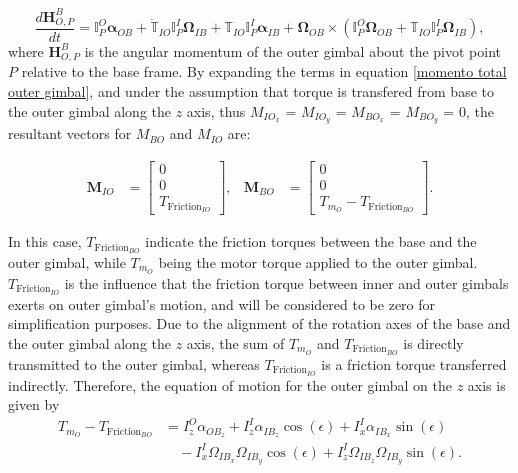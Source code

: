 \begin{equation}
   \label{momento total outer gimbal}
   \frac{d\bm{H}^B_{O,P}}{dt} = \mathbb{I}^O_P \bm{\alpha}_{OB} + \mathbb{\dot T}_{IO} \mathbb{I}^I_P \bm{\Omega}_{IB} + \mathbb{T}_{IO} \mathbb{I}^I_P \bm{\alpha}_{IB} + \bm{\Omega}_{OB} \times (\mathbb{I}^O_P \bm{\Omega}_{OB} + \mathbb{T}_{IO} \mathbb{I}^I_P \bm{\Omega}_{IB}),
\end{equation}
where $\mathbf{H}^B_{O,P}$ is the angular momentum of the outer gimbal about the pivot point $P$ relative to the base frame. By expanding the terms in equation \eqref{momento total outer gimbal}, and under the assumption that torque is transfered from base to the outer gimbal along the $z$ axis, thus $M_{IO_x}$ = $M_{IO_y}$ = $M_{BO_x}$ = $M_{BO_y}$ = 0, the resultant vectors for $M_{BO}$ and $M_{IO}$ are:

\begin{align*}
     \mathbf{M}_{IO} &= \left[\begin{matrix}0 \\ 0 \\ T_{\text{Friction}_{IO}}\end{matrix}\right], & \mathbf{M}_{BO} &= \left[\begin{matrix}0 \\ 0 \\ T_{m_O} - T_{\text{Friction}_{BO}}\end{matrix}\right].
\end{align*}

In this case, $T_{\text{Friction}_{BO}}$ indicate the friction torques between the base and the outer gimbal, while $T_{m_O}$ being the motor torque applied to the outer gimbal. $T_{\text{Friction}_{IO}}$ is the influence that the friction torque between inner and outer gimbals exerts on outer gimbal's motion, and will be considered to be zero for simplification purposes. Due to the alignment of the rotation axes of the base and the outer gimbal along the $z$ axis, the sum of $T_{m_O}$ and $T_{\text{Friction}_{BO}}$ is directly transmitted to the outer gimbal, whereas $T_{\text{Friction}_{IO}}$ is a friction torque transferred indirectly. Therefore, the equation of motion for the outer gimbal on the $z$ axis is given by
\begin{equation}
\label{movimento rotacional outer gimbal}
\begin{split}
    T_{m_O} - T_{\text{Friction}_{BO}} &= I^O_z \alpha_{{OB}_z} + I^I_z \alpha_{{IB}_z} \cos(\epsilon) + I^I_x \alpha_{{IB}_x} \sin(\epsilon) \\
    &\quad - I^I_x \Omega_{{IB}_x} \Omega_{{IB}_y} \cos(\epsilon) + I^I_z\Omega_{{IB}_z} \Omega_{{IB}_y} \sin(\epsilon).
\end{split}
\end{equation}
